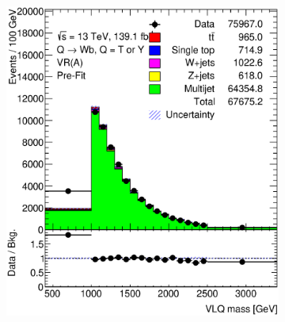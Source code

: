 \begin{figure}[hbt!]
	\centering
	\begin{subfigure}{.35\textwidth}
		\centering
		\includegraphics[width=\linewidth,height=\textheight,keepaspectratio]{figs/chapter5/prefitintegral/VR_B_VLQM.eps}
		\caption{}
		\label{fig:abcd:furtherimprovement:scaledcorr:prefit:integral:VLQM}
	\end{subfigure}\hspace{0.6cm}
	\begin{subfigure}{.35\textwidth}
		\centering

\end{subfigure}
\end{figure}

